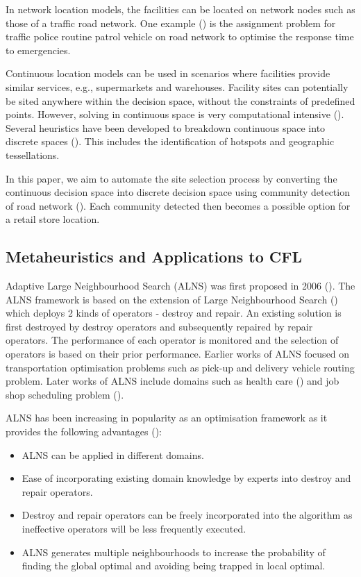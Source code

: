 \documentclass{ecai}
\begin{document}
In network location models, the facilities can be located on network nodes such as those of a traffic road network. One example (\cite{adler2014location}) is the assignment problem for traffic police routine patrol vehicle on road network to optimise the response time to emergencies. 

Continuous location models can be used in scenarios where facilities provide similar services, e.g., supermarkets and warehouses. Facility sites can potentially be sited anywhere within the decision space, without the constraints of predefined points. However, solving in continuous space is very computational intensive (\cite{revelle2005location}). Several heuristics have been developed to breakdown continuous space into discrete spaces (\cite{griffith2022spatial}). This includes the identification of hotspots and geographic tessellations.

In this paper, we aim to automate the site selection process by converting the continuous decision space into discrete decision space using community detection of road network (\cite{tan2022data}). Each community detected then becomes a possible option for a retail store location.   

\subsection{Metaheuristics and Applications to CFL}

Adaptive Large Neighbourhood Search (ALNS) was first proposed in 2006 (\cite{ropke2006adaptive}). The ALNS framework is based on the extension of Large Neighbourhood Search (\cite{shaw1998using}) which deploys 2 kinds of operators - destroy and repair. An existing solution is first destroyed by destroy operators and subsequently repaired by repair operators. The performance of each operator is monitored and the selection of operators is based on their prior performance.  Earlier works of ALNS focused on transportation optimisation problems such as pick-up and delivery vehicle routing problem. Later works of ALNS include domains such as health care (\cite{issabakhsh2021scheduling}) and job shop scheduling problem (\cite{cordeau2010scheduling}). 

ALNS has been increasing in popularity as an optimisation framework as it provides the following advantages (\cite{mara2022survey}):
\begin{itemize}
    \item ALNS can be applied in different domains.
    \item Ease of incorporating existing domain knowledge by experts into destroy and repair operators. 
    \item Destroy and repair operators can be freely incorporated into the algorithm as ineffective operators will be less frequently executed.
    \item ALNS generates multiple neighbourhoods to increase the probability of finding the global optimal and avoiding being trapped in local optimal.    
\end{itemize}
\end{document}
